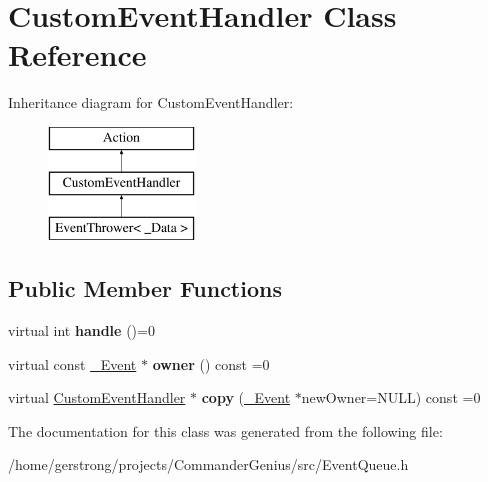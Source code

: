 \hypertarget{class_custom_event_handler}{
\section{CustomEventHandler Class Reference}
\label{class_custom_event_handler}
}
Inheritance diagram for CustomEventHandler:\begin{figure}[H]
\begin{center}
\leavevmode
\includegraphics[height=3cm]{class_custom_event_handler}
\end{center}
\end{figure}
\subsection*{Public Member Functions}
\begin{DoxyCompactItemize}
\item 
\hypertarget{class_custom_event_handler_adee5105bfcba1dbabb1b29bc8346e444}{
virtual int {\bfseries handle} ()=0}
\label{class_custom_event_handler_adee5105bfcba1dbabb1b29bc8346e444}

\item 
\hypertarget{class_custom_event_handler_a143baf9966c65f431617f5e8b646b0f6}{
virtual const \hyperlink{class___event}{\_\-Event} $\ast$ {\bfseries owner} () const =0}
\label{class_custom_event_handler_a143baf9966c65f431617f5e8b646b0f6}

\item 
\hypertarget{class_custom_event_handler_a09e0f242fa2585e3e0bf9a398212e0be}{
virtual \hyperlink{class_custom_event_handler}{CustomEventHandler} $\ast$ {\bfseries copy} (\hyperlink{class___event}{\_\-Event} $\ast$newOwner=NULL) const =0}
\label{class_custom_event_handler_a09e0f242fa2585e3e0bf9a398212e0be}

\end{DoxyCompactItemize}


The documentation for this class was generated from the following file:\begin{DoxyCompactItemize}
\item 
/home/gerstrong/projects/CommanderGenius/src/EventQueue.h\end{DoxyCompactItemize}
